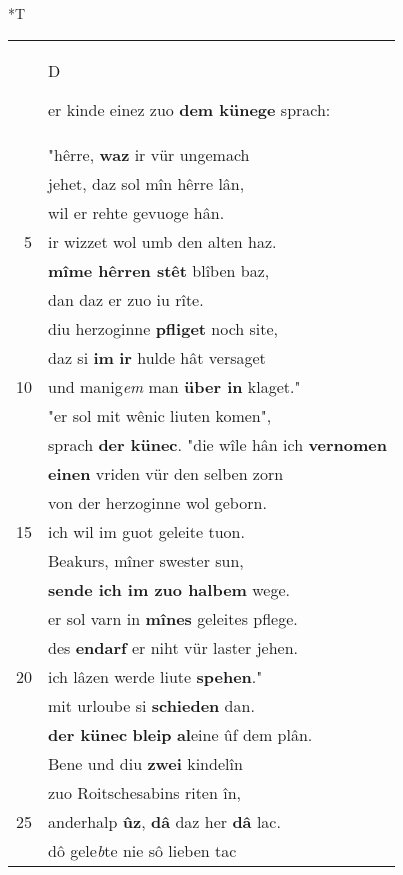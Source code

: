 \documentclass[8pt,a4paper,notitlepage]{article}
\begin{document}
\begin{table}[ht]
\begin{minipage}[t]{0.5\linewidth}
\small
\begin{center}*T
\end{center}
\begin{tabular}{rl}
 & \begin{large}D\end{large}er kinde einez zuo \textbf{dem künege} sprach:\\ 
 & "hêrre, \textbf{waz} ir vür ungemach\\ 
 & jehet, daz sol mîn hêrre lân,\\ 
 & wil er rehte gevuoge hân.\\ 
5 & ir wizzet wol umb den alten haz.\\ 
 & \textbf{mîme hêrren stêt} blîben baz,\\ 
 & dan daz er zuo iu rîte.\\ 
 & diu herzoginne \textbf{pfliget} noch site,\\ 
 & daz si \textbf{im} \textbf{ir} hulde hât versaget\\ 
10 & und manig\textit{em} man \textbf{über in} klaget."\\ 
 & "er sol mit wênic liuten komen",\\ 
 & sprach \textbf{der künec}. "die wîle hân ich \textbf{vernomen}\\ 
 & \textbf{einen} vriden vür den selben zorn\\ 
 & von der herzoginne wol geborn.\\ 
15 & ich wil im guot geleite tuon.\\ 
 & Beakurs, mîner swester sun,\\ 
 & \textbf{sende ich im zuo halbem} wege.\\ 
 & er sol varn in \textbf{mînes} geleites pflege.\\ 
 & des \textbf{en}\textbf{darf} er niht vür laster jehen.\\ 
20 & ich lâzen werde liute \textbf{spehen}."\\ 
 & mit urloube si \textbf{schieden} dan.\\ 
 & \textbf{der künec} \textbf{bleip} \textbf{al}eine ûf dem plân.\\ 
 & Bene und diu \textbf{zwei} kindelîn\\ 
 & zuo Roitschesabins riten în,\\ 
25 & anderhalp \textbf{ûz}, \textbf{dâ} daz her \textbf{dâ} lac.\\ 
 & dô gele\textit{b}te nie sô lieben tac\\ 

\end{tabular}
\end{minipage}
\end{table}
\end{document}
